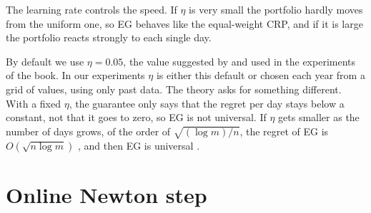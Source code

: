 The learning rate controls the speed. If $\eta$ is very small the portfolio hardly moves
from the uniform one, so EG behaves like the equal-weight CRP, and if it is large the
portfolio reacts strongly to each single day. 

By default we use $\eta=0.05$, the value suggested by \textcite{helmbold98} and used in
the experiments of the book. In our experiments $\eta$ is either this default or chosen %
each year from a grid of values, using only past data. The theory asks for something
different. With a fixed $\eta$, the guarantee only says that the regret per day stays
below a constant, not that it goes to zero, so EG is not universal. If $\eta$ gets 
smaller as the number of days grows, of the order of %
$\sqrt{(\log m)/n}$, the regret of EG is $O(\sqrt{n\log m})$
\parencite{helmbold98}, and then EG is universal \parencite[Sec.~4.2]{lihoi}.


\section{Online Newton step}


